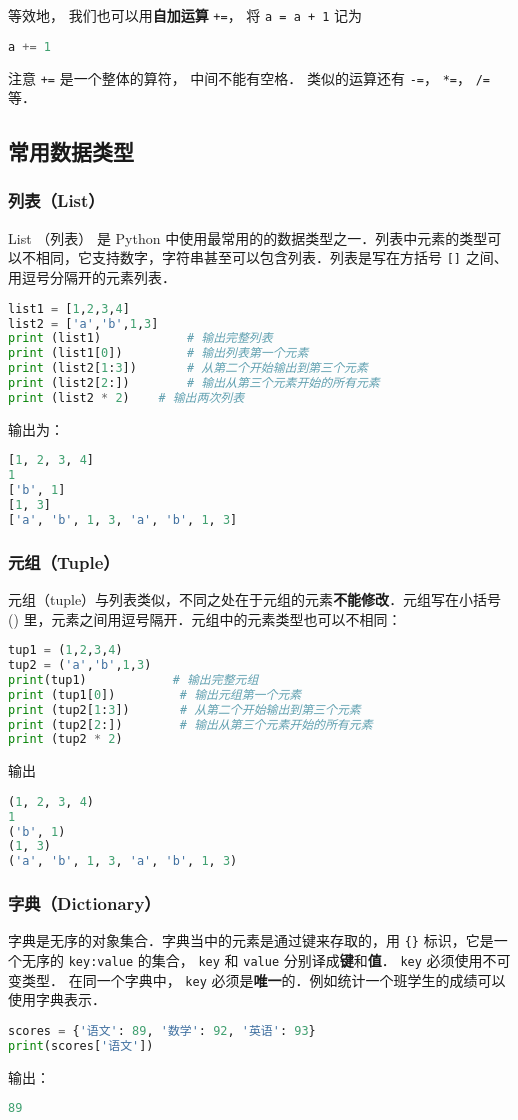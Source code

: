 等效地， 我们也可以用\textbf{自加运算} \verb|+=|， 将 \verb|a = a + 1| 记为
\begin{lstlisting}[language=python]
a += 1
\end{lstlisting}
注意 \verb|+=| 是一个整体的算符， 中间不能有空格． 类似的运算还有 \verb|-=|， \verb|*=|， \verb|/=| 等．

\subsection{常用数据类型}
\subsubsection{列表（List）}
List （列表） 是 Python 中使用最常用的的数据类型之一．列表中元素的类型可以不相同，它支持数字，字符串甚至可以包含列表．列表是写在方括号 \verb|[]| 之间、用逗号分隔开的元素列表．
\begin{lstlisting}[language=python]
list1 = [1,2,3,4]
list2 = ['a','b',1,3]
print (list1)            # 输出完整列表
print (list1[0])         # 输出列表第一个元素
print (list2[1:3])       # 从第二个开始输出到第三个元素
print (list2[2:])        # 输出从第三个元素开始的所有元素
print (list2 * 2)    # 输出两次列表
\end{lstlisting}
输出为：
\begin{lstlisting}[language=python]
[1, 2, 3, 4]
1
['b', 1]
[1, 3]
['a', 'b', 1, 3, 'a', 'b', 1, 3]
\end{lstlisting}
\subsubsection{元组（Tuple）}
元组（tuple）与列表类似，不同之处在于元组的元素\textbf{不能修改}．元组写在小括号 () 里，元素之间用逗号隔开．元组中的元素类型也可以不相同：
\begin{lstlisting}[language=python]
tup1 = (1,2,3,4)
tup2 = ('a','b',1,3)
print(tup1)            # 输出完整元组
print (tup1[0])         # 输出元组第一个元素
print (tup2[1:3])       # 从第二个开始输出到第三个元素
print (tup2[2:])        # 输出从第三个元素开始的所有元素
print (tup2 * 2)
\end{lstlisting}
输出
\begin{lstlisting}[language=python]
(1, 2, 3, 4)
1
('b', 1)
(1, 3)
('a', 'b', 1, 3, 'a', 'b', 1, 3)

\end{lstlisting}
\subsubsection{字典（Dictionary）}
字典是无序的对象集合．字典当中的元素是通过键来存取的，用 \verb|{}| 标识，它是一个无序的 \verb|key:value| 的集合， \verb|key| 和 \verb|value| 分别译成\textbf{键}和\textbf{值}． \verb|key| 必须使用不可变类型． 在同一个字典中， \verb|key| 必须是\textbf{唯一}的．例如统计一个班学生的成绩可以使用字典表示．
\begin{lstlisting}[language=python]
scores = {'语文': 89, '数学': 92, '英语': 93}
print(scores['语文'])
\end{lstlisting}
输出：
\begin{lstlisting}[language=python]
89
\end{lstlisting}
